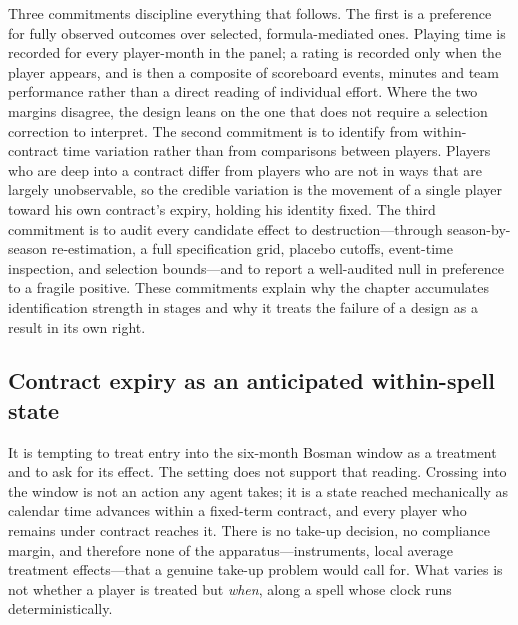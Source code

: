 Three commitments discipline everything that follows. The first is a preference for
fully observed outcomes over selected, formula-mediated ones. Playing time is
recorded for every player-month in the panel; a rating is recorded only when the
player appears, and is then a composite of scoreboard events, minutes and team
performance rather than a direct reading of individual effort. Where the two
margins disagree, the design leans on the one that does not require a selection
correction to interpret. The second commitment is to identify from within-contract
time variation rather than from comparisons between players. Players who are deep
into a contract differ from players who are not in ways that are largely
unobservable, so the credible variation is the movement of a single player toward
his own contract's expiry, holding his identity fixed. The third commitment is to
audit every candidate effect to destruction---through season-by-season
re-estimation, a full specification grid, placebo cutoffs, event-time inspection,
and selection bounds---and to report a well-audited null in preference to a fragile
positive. These commitments explain why the chapter accumulates identification
strength in stages and why it treats the failure of a design as a result in its own
right.

\subsection{Contract expiry as an anticipated within-spell state}
\label{sec:strategy-treatment}

It is tempting to treat entry into the six-month Bosman window as a treatment and
to ask for its effect. The setting does not support that reading. Crossing into the
window is not an action any agent takes; it is a state reached mechanically as
calendar time advances within a fixed-term contract, and every player who remains
under contract reaches it. There is no take-up decision, no compliance margin, and
therefore none of the apparatus---instruments, local average treatment
effects---that a genuine take-up problem would call for. What varies is not whether
a player is treated but \emph{when}, along a spell whose clock runs
deterministically.

